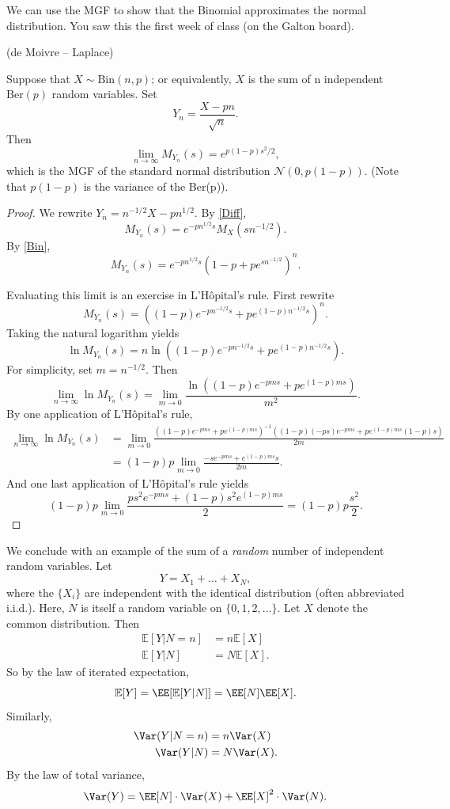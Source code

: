 \documentclass{ximera}
\begin{document}
We can use the MGF to show that the Binomial approximates the normal distribution. You saw this the first week of class (on the Galton board).
\begin{theorem} (de Moivre -- Laplace)

Suppose that $X \sim \textrm{Bin}(n,p)$; or equivalently, $X$ is the sum of n independent $\textrm{Ber}(p)$ random variables.  Set 
$$
Y_n = \frac{X-pn}{\sqrt{n}}.
$$ 
Then 
$$
\lim_{n\rightarrow \infty} M_{Y_n}(s) = e^{p(1-p) s^2/2},
$$
which is the MGF of the standard normal distribution $\mathcal{N}(0,p(1-p))$. (Note that $p(1-p)$ is the variance of the \textrm{Ber}(p)).
\end{theorem}
\begin{proof}
We rewrite ${Y_n}=n^{-1/2}X - pn^{1/2}.$ By \eqref{Diff},
$$
M_{Y_n}(s) = e^{-p n^{1/2} s} M_X( s n^{-1/2}).
$$
By \eqref{Bin},
$$
M_{Y_n}(s) = e^{-p n^{1/2} s}  ( 1 - p + p e^{sn^{-1/2}})^n.
$$

Evaluating this limit is an exercise in L'H\^{o}pital's rule. First rewrite 
$$
M_{Y_n}(s) = \left( (1-p) e^{-pn^{-1/2}s} + pe^{(1-p)n^{-1/2}s} \right)^n.
$$
Taking the natural logarithm yields
$$
\ln M_{Y_n}(s) = n \ln \left( (1-p) e^{-pn^{-1/2}s} + pe^{(1-p)n^{-1/2}s}  \right).
$$
For simplicity, set $m=n^{-1/2}$. Then
$$
\lim_{n\rightarrow \infty} \ln M_{Y_n}(s) = \lim_{m\rightarrow 0} \frac{\ln\left( (1-p) e^{-pms} + p e^{(1-p)ms}    \right)}{m^2}.
$$
By one application of L'H\^{o}pital's rule,
\begin{align*}
\lim_{n\rightarrow \infty} \ln M_{Y_n}(s) &= \lim_{m\rightarrow 0} \frac{\left( (1-p) e^{-pms} + p e^{(1-p)ms}    \right)^{-1}  ( (1-p)(-ps)e^{-pms} + p e^{(1-p)ms}(1-p)s   )}{2m}\\
&= (1-p)p \lim_{m\rightarrow 0} \frac{-s e^{-pms} + e^{(1-p)ms}s}{2m}.
\end{align*}
And one last application of L'H\^{o}pital's rule yields 
$$
(1-p)p \lim_{m\rightarrow 0} \frac{ps^2 e^{-pms} + (1-p)s^2 e^{(1-p)ms}}{2} = (1-p)p \frac{s^2}{2}.
$$
\end{proof}

We conclude with an example of the sum of a \textit{random} number of independent random variables. Let 
$$
Y= X_1 + \ldots + X_N,
$$
where the $\{X_i\}$ are independent with the identical distribution (often abbreviated i.i.d.). Here, $N$ is itself a random variable on $\{0,1,2,\ldots\}$. Let $X$ denote the common distribution. Then
\begin{align*}
\mathbb{E}[Y \vert N=n] &= n \mathbb{E}[X]\\
\mathbb{E}[Y \vert N] &= N \mathbb{E}[X].
\end{align*}
So by the law of iterated expectation,
$$
\mathbb{E}[Y] = \EE[\mathbb{E}[Y \vert N] ]= \EE[N] \EE[X].
$$
Similarly,
\begin{align*}
\Var(Y \vert N=n) &= n \Var(X)\\
\Var(Y \vert N) &= N \Var(X).
\end{align*}
By the law of total variance,
$$
\Var(Y) = \EE[N] \cdot \Var(X) + \EE[X]^2 \cdot \Var(N).
$$
\end{document}
